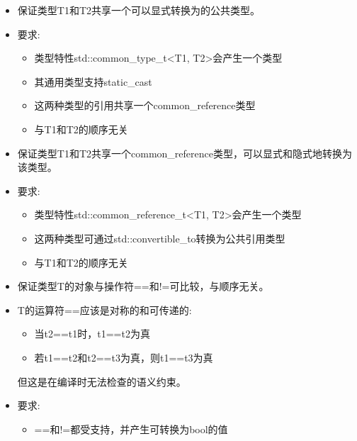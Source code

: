 \begin{itemize}
\item
保证类型T1和T2共享一个可以显式转换为的公共类型。

\item
要求:
\begin{itemize}
\item
类型特性std::common\_type\_t<T1, T2>会产生一个类型

\item
其通用类型支持static\_cast

\item
这两种类型的引用共享一个common\_reference类型

\item
与T1和T2的顺序无关
\end{itemize}
\end{itemize}


\begin{itemize}
\item
保证类型T1和T2共享一个common\_reference类型，可以显式和隐式地转换为该类型。

\item
要求:
\begin{itemize}
\item
类型特性std::common\_reference\_t<T1, T2>会产生一个类型

\item
这两种类型可通过std::convertible\_to转换为公共引用类型

\item
与T1和T2的顺序无关
\end{itemize}
\end{itemize}



\begin{itemize}
\item
保证类型T的对象与操作符==和!=可比较，与顺序无关。

\item
T的运算符==应该是对称的和可传递的:
\begin{itemize}
\item
当t2==t1时，t1==t2为真

\item
若t1==t2和t2==t3为真，则t1==t3为真
\end{itemize}

但这是在编译时无法检查的语义约束。

\item
要求:
\begin{itemize}
\item
==和!=都受支持，并产生可转换为bool的值
\end{itemize}
\end{itemize}

